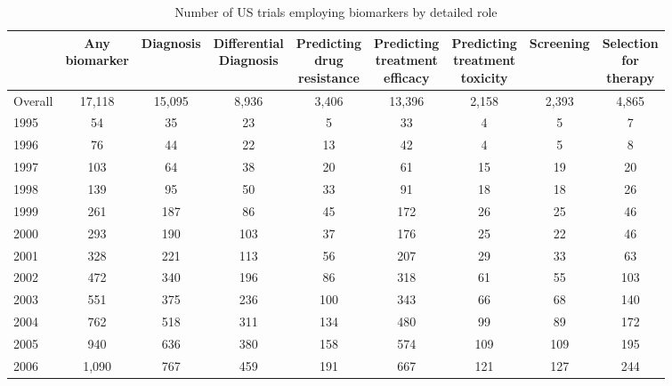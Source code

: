 \begin{table}[htbp]\centering
\caption{Number of US trials employing biomarkers by detailed role}
\begin{tabular}{l*{8}{c}}
\hline\hline
          &\shortstack{Any\\biomarker}&Diagnosis&\shortstack{Differential\\Diagnosis}&\shortstack{Predicting\\drug\\resistance}&\shortstack{Predicting\\treatment\\efficacy}&\shortstack{Predicting\\treatment\\toxicity}&Screening&\shortstack{Selection\\for\\therapy}\\
\hline
Overall   &   17,118&   15,095&    8,936&    3,406&   13,396&    2,158&    2,393&    4,865\\
1995      &       54&       35&       23&        5&       33&        4&        5&        7\\
1996      &       76&       44&       22&       13&       42&        4&        5&        8\\
1997      &      103&       64&       38&       20&       61&       15&       19&       20\\
1998      &      139&       95&       50&       33&       91&       18&       18&       26\\
1999      &      261&      187&       86&       45&      172&       26&       25&       46\\
2000      &      293&      190&      103&       37&      176&       25&       22&       46\\
2001      &      328&      221&      113&       56&      207&       29&       33&       63\\
2002      &      472&      340&      196&       86&      318&       61&       55&      103\\
2003      &      551&      375&      236&      100&      343&       66&       68&      140\\
2004      &      762&      518&      311&      134&      480&       99&       89&      172\\
2005      &      940&      636&      380&      158&      574&      109&      109&      195\\
2006      &    1,090&      767&      459&      191&      667&      121&      127&      244\\

\end{tabular}
\end{table}
